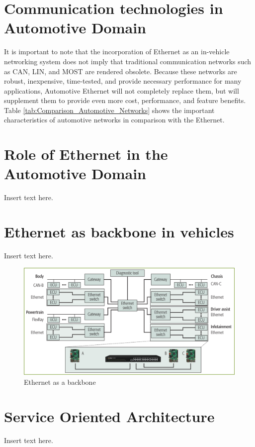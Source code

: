 \section{Communication technologies in Automotive Domain}
It is important to note that the incorporation of Ethernet as an in-vehicle networking system does not imply that traditional communication networks such as CAN, LIN, and MOST are rendered obsolete. Because these networks are robust, inexpensive, time-tested, and provide necessary performance for many applications, Automotive Ethernet will not completely replace them, but will supplement them to provide even more cost, performance, and feature benefits. Table \ref{tab:Comparison_Automotive_Networks} shows the important characteristics of automotive networks in comparison with the Ethernet.


\section{Role of Ethernet in the Automotive Domain}
Insert text here.

\section{Ethernet as backbone in vehicles}
Insert text here.
\begin{figure}[!htb]
	\centering
		\includegraphics[width=1\textwidth]{images/Switched_Ethernet_backbone.png}
	\caption{Ethernet as a backbone \cite{b5.0}}
	\label{fig:Switched_Ethernet_backbone}
\end{figure}


\section{Service Oriented Architecture}
Insert text here.	

